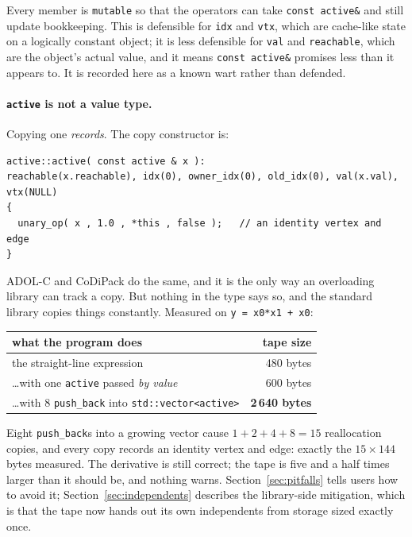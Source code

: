 \documentclass[11pt,a4paper]{report}
\newcommand{\code}[1]{\texttt{#1}}
\begin{document}
Every member is \code{mutable} so that the operators can take
\code{const active\&} and still update bookkeeping. This is defensible for
\code{idx} and \code{vtx}, which are cache-like state on a logically constant
object; it is less defensible for \code{val} and \code{reachable}, which are
the object's actual value, and it means \code{const active\&} promises less
than it appears to. It is recorded here as a known wart rather than defended.

\paragraph{\code{active} is not a value type.} Copying one \emph{records}. The
copy constructor is:

\begin{lstlisting}
active::active( const active & x ):
reachable(x.reachable), idx(0), owner_idx(0), old_idx(0), val(x.val), vtx(NULL)
{
  unary_op( x , 1.0 , *this , false );   // an identity vertex and edge
}
\end{lstlisting}

ADOL-C and CoDiPack do the same, and it is the only way an overloading library
can track a copy. But nothing in the type says so, and the standard library
copies things constantly. Measured on \code{y = x0*x1 + x0}:

\begin{center}
\begin{tabular}{@{}lr@{}}
\toprule
what the program does & tape size \\
\midrule
the straight-line expression                          & 480 bytes \\
\dots with one \code{active} passed \emph{by value}   & 600 bytes \\
\dots with 8 \code{push\_back} into \code{std::vector<active>} & \textbf{2\,640 bytes} \\
\bottomrule
\end{tabular}
\end{center}

\noindent
Eight \code{push\_back}s into a growing vector cause $1+2+4+8=15$ reallocation
copies, and every copy records an identity vertex and edge: exactly the
$15\times144$ bytes measured. The derivative is still correct; the tape is five
and a half times larger than it should be, and nothing warns. Section~\ref{sec:pitfalls}
tells users how to avoid it; Section~\ref{sec:independents} describes the
library-side mitigation, which is that the tape now hands out its own
independents from storage sized exactly once.
\end{document}
